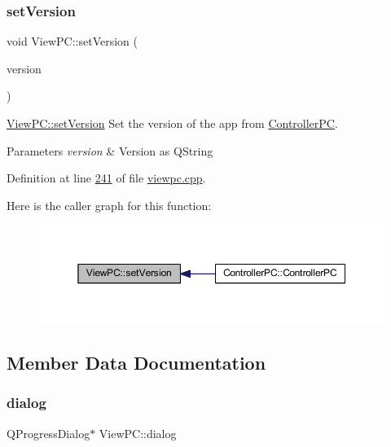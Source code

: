 \subsubsection{\texorpdfstring{set\+Version}{setVersion}}
{\footnotesize\ttfamily void View\+P\+C\+::set\+Version (\begin{DoxyParamCaption}\item[{Q\+String}]{version }\end{DoxyParamCaption})\hspace{0.3cm}{\ttfamily [slot]}}



\mbox{\hyperlink{class_view_p_c_ac05220df875b7c4f24405a5742476ebf}{View\+P\+C\+::set\+Version}} Set the version of the app from \mbox{\hyperlink{class_controller_p_c}{Controller\+PC}}. 


\begin{DoxyParams}{Parameters}
{\em version} & Version as Q\+String \\
\hline
\end{DoxyParams}


Definition at line \mbox{\hyperlink{viewpc_8cpp_source_l00241}{241}} of file \mbox{\hyperlink{viewpc_8cpp_source}{viewpc.\+cpp}}.

Here is the caller graph for this function\+:
\nopagebreak
\begin{figure}[H]
\begin{center}
\leavevmode
\includegraphics[width=350pt]{class_view_p_c_ac05220df875b7c4f24405a5742476ebf_icgraph}
\end{center}
\end{figure}


\subsection{Member Data Documentation}
\mbox{\label{class_view_p_c_a31abbb470fe329b44e6ffee202b903ca}} 
\subsubsection{\texorpdfstring{dialog}{dialog}}
{\footnotesize\ttfamily Q\+Progress\+Dialog$\ast$ View\+P\+C\+::dialog}



